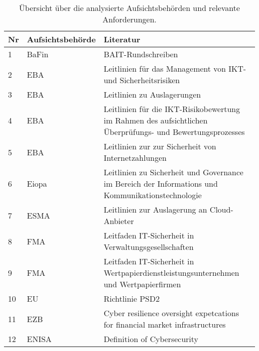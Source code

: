 \begin{table}[H]
    \tiny
    \centering
    \caption{Übersicht über die analysierte Aufsichtsbehörden und relevante Anforderungen.} 
        \begin{tabular}{llp{10cm}}
            \hline
            Nr & Aufsichtsbehörde & Literatur\\
            \hline\hline
            1 & BaFin & BAIT-Rundschreiben \autocite{bafin_rundschreiben}\\
            2 & EBA & Leitlinien für das Management von IKT- und Sicherheitsrisiken \autocite{eba_final_draft}\\
            3 & EBA & Leitlinien zu Auslagerungen \autocite{eba_outsourcing_arrangements}\\
            4 & EBA & Leitlinien für die IKT-Risikobewertung im Rahmen des aufsichtlichen Überprüfungs- und Bewertungsprozesses \autocite{eba_risk_assessment}\\
            5 & EBA & Leitlinien zur zur Sicherheit von Internetzahlungen \autocite{eba_internet_security}\\
            6 & Eiopa & Leitlinien zu Sicherheit und Governance im Bereich der Informations und Kommunikationstechnologie \autocite{Eiopa_guideline}\\
            7 & ESMA & Leitlinien zur Auslagerung an Cloud-Anbieter \autocite{ESMA_Cloud}\\
            8 & FMA & Leitfaden IT-Sicherheit in Verwaltungsgesellschaften \autocite{FMA_Leitfaden_IT_Sicherheit}\\
            9 & FMA & Leitfaden IT-Sicherheit in Wertpapierdienstleistungsunternehmen und Wertpapierfirmen \autocite{FMA_Leitfaden_IT_Sicherheit_Wertpapier}\\
            10 & EU & Richtlinie PSD2 \autocite{EU_PSD2}\\
            11 & EZB & Cyber resilience oversight expetcations for financial market infrastructures \autocite{CROE}\\
            12 & ENISA & Definition of Cybersecurity \autocite{ENISA_Defition_Cybersecurity}\\
        \end{tabular}
        \label{table:uebersicht_evaluierte_literatur}
\end{table}


